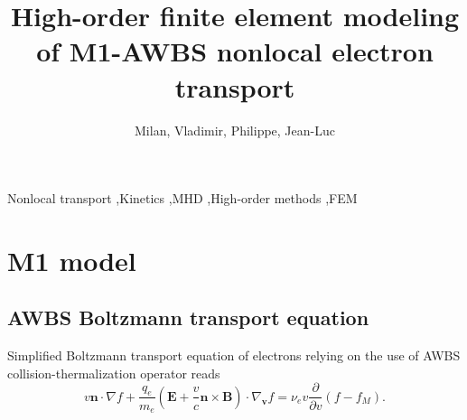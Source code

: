 \documentclass[review]{elsarticle}
\newcommand{\pdv}[2]{\frac{\partial{#1}}{\partial{#2}}}
\newcommand{\vect}[1]{\boldsymbol{#1}}
\newcommand{\nue}{\nu_{e}}
\newcommand{\vmag}{v}
\newcommand{\vn}{\vect{n}}
\newcommand{\E}{\vect{E}}
\newcommand{\B}{\vect{B}}
\newcommand{\qe}{q_e}
\newcommand{\me}{m_e}
\newcommand{\fM}{f_M}
\begin{document}
\begin{frontmatter}

\title{High-order finite element modeling of M1-AWBS nonlocal electron transport}

\author[celiaaddress]{Milan, Vladimir, Philippe, Jean-Luc}
\address[celiaaddress]{Universit\'{e} de Bordeaux - CNRS - CEA, CELIA, UMR 5107, F-33405 Talence, France}


\begin{abstract}

\end{abstract}

\begin{keyword}
Nonlocal transport \sep Kinetics \sep MHD \sep High-order methods \sep FEM
\end{keyword}

\end{frontmatter}

\linenumbers


\newpage


\section{M1 model}\label{sec:m1_model}
\subsection{AWBS Boltzmann transport equation}
Simplified Boltzmann transport equation of electrons relying on the use of AWBS
collision-thermalization operator \cite{AWBS_PRL1986} reads
\begin{equation}
  \vmag\vn\cdot\nabla f + \frac{\qe}{\me}\left( \E + 
  \frac{\vmag}{c}\vn\times\B\right)\cdot\nabla_{\vect{v}} f = \nue \vmag 
  \pdv{}{\vmag}\left( f - \fM\right) .
  \label{eq:AWBS}
\end{equation}
\end{document}
